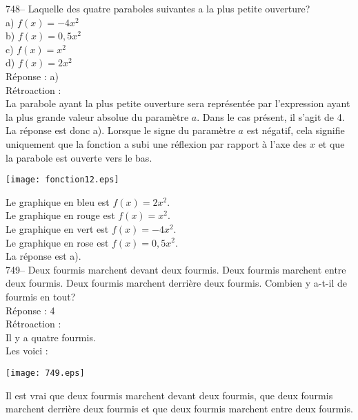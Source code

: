 ﻿\documentclass[letterpaper, 12pt]{article}
\begin{document}
748-- Laquelle des quatre paraboles suivantes a la plus petite ouverture?\\
a) $f(x)=-4x^{2}$\\
b) $f(x)=0,5x^{2}$\\
c) $f(x)=x^{2}$\\
d) $f(x)=2x^{2}$\\

R\'eponse : a)\\

R\'etroaction : \\
La parabole ayant la plus petite ouverture sera repr\'esent\'ee par
l'expression ayant la plus grande valeur absolue du param\`etre $a$. Dans le
cas pr\'esent, il s'agit de 4. La r\'eponse est donc a). Lorsque le signe du
param\`etre $a$ est n\'egatif, cela signifie uniquement que la fonction a
subi une r\'eflexion par rapport \`a l'axe des $x$ et que la parabole est
ouverte vers le bas.\\
    \begin{center}
    \texttt{[image: fonction12.eps]}
    \end{center}


Le graphique en bleu est $f(x)=2x^{2}$.\\
Le graphique en rouge est $f(x)=x^{2}$.\\
Le graphique en vert est $f(x)=-4x^{2}$.\\
Le graphique en rose est $f(x)=0,5x^{2}$.\\
La r\'eponse est a).\\


749-- Deux fourmis marchent devant deux fourmis.  Deux fourmis marchent
entre deux fourmis.  Deux fourmis marchent derri\`ere deux fourmis.  Combien
y a-t-il de fourmis en tout?\\


R\'eponse : 4\\

R\'etroaction :\\
Il y a quatre fourmis.\\
Les voici :\\
\begin{center}
\texttt{[image: 749.eps]}
\end{center}

Il est vrai que deux fourmis marchent devant deux fourmis, que deux fourmis
marchent derri\`ere deux fourmis et que deux fourmis marchent entre deux
fourmis. \\
\end{document}
